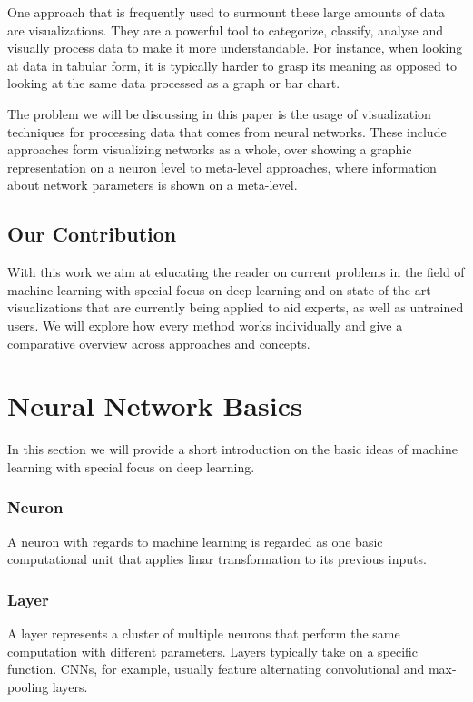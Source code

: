 \documentclass{acmsiggraph}               %
\begin{document}
One approach that is frequently used to surmount these large amounts of data are visualizations. They are a powerful tool to categorize, classify, analyse and visually process data to make it more understandable. For instance, when looking at data in tabular form, it is typically harder to grasp its meaning as opposed to looking at the same data processed as a graph or bar chart.

The problem we will be discussing in this paper is the usage of visualization techniques for processing data that comes from neural networks. These include approaches form visualizing networks as a whole, over showing a graphic representation on a neuron level to meta-level approaches, where information about network parameters is shown on a meta-level.

\subsection{Our Contribution}
With this work we aim at educating the reader on current problems in the field of machine learning with special focus on deep learning and on state-of-the-art visualizations that are currently being applied to aid experts, as well as untrained users. We will explore how every method works individually and give a comparative overview across approaches and concepts.

\section{Neural Network Basics}
In this section we will provide a short introduction on the basic ideas of machine learning with special focus on deep learning.

\subsubsection{Neuron}
A neuron with regards to machine learning is regarded as one basic computational unit that applies linar transformation to its previous inputs.

\subsubsection{Layer}
A layer represents a cluster of multiple neurons that perform the same computation with different parameters. Layers typically take on a specific function. CNNs, for example, usually feature alternating convolutional and max-pooling layers. 
\end{document}
